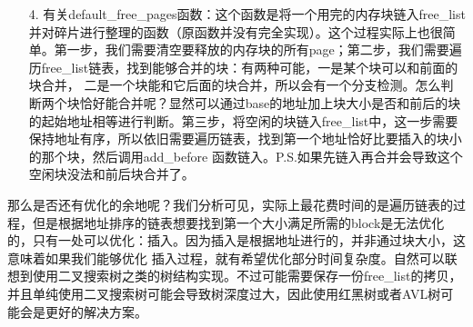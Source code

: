 \documentclass[UTF8, a4paper]{ctexart}
\begin{document}
\begin{enumerate}
\begin{enumerate}
        \item [4.] 有关default\_free\_pages函数：这个函数是将一个用完的内存块链入free\_list并对碎片进行整理的函数（原函数并没有完全实现）。这个过程实际上也很简单。第一步，我们需要清空要释放的内存块的所有page；第二步，我们需要遍历free\_list链表，找到能够合并的块：有两种可能，一是某个块可以和前面的块合并，
                   二是一个块能和它后面的块合并，所以会有一个分支检测。怎么判断两个块恰好能合并呢？显然可以通过base的地址加上块大小是否和前后的块的起始地址相等进行判断。第三步，将空闲的块链入free\_list中，这一步需要保持地址有序，所以依旧需要遍历链表，找到第一个地址恰好比要插入的块小的那个块，然后调用add\_before
                   函数链入。P.S.如果先链入再合并会导致这个空闲块没法和前后块合并了。
    \end{enumerate}
    那么是否还有优化的余地呢？我们分析可见，实际上最花费时间的是遍历链表的过程，但是根据地址排序的链表想要找到第一个大小满足所需的block是无法优化的，只有一处可以优化：插入。因为插入是根据地址进行的，并非通过块大小，这意味着如果我们能够优化
    插入过程，就有希望优化部分时间复杂度。自然可以联想到使用二叉搜索树之类的树结构实现。不过可能需要保存一份free\_list的拷贝，并且单纯使用二叉搜索树可能会导致树深度过大，因此使用红黑树或者AVL树可能会是更好的解决方案。


\end{enumerate}
\end{document}
